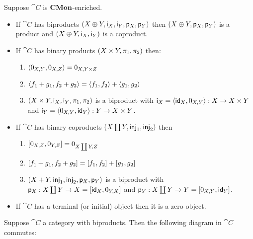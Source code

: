 \begin{proposition}
\label{prop:biproduct:from-product-or-coproduct}
Suppose $\cat{C}$ is $\mathbf{CMon}$-enriched.
\begin{itemize}
\item If $\cat{C}$ has biproducts $(X \oplus Y, \mathsf{i}_X, \mathsf{i}_Y, \mathsf{p}_X, \mathsf{p}_Y)$ then $(X
\oplus Y, \mathsf{p}_X, \mathsf{p}_Y)$ is a product and $(X \oplus Y, \mathsf{i}_X, \mathsf{i}_Y)$ is a coproduct.
\item If $\cat{C}$ has binary products $(X \times Y, \pi_1, \pi_2)$ then:
\begin{enumerate}
\item $\langle 0_{X,Y}, 0_{X,Z}\rangle = 0_{X,Y \times Z}$
\item $\langle f_1 + g_1, f_2 + g_2\rangle = \langle f_1, f_2\rangle + \langle g_1, g_2\rangle$
\item $(X \times Y, \mathsf{i}_X, \mathsf{i}_Y, \pi_1, \pi_2)$ is a biproduct with $\mathsf{i}_X =
\langle \mathsf{id}_X, 0_{X,Y}\rangle: X \to X \times Y$ and $\mathsf{i}_Y = \langle 0_{X,Y}, \mathsf{id}_Y\rangle: Y \to X \times Y$.
\end{enumerate}
\item If $\cat{C}$ has binary coproducts $(X \coprod Y, \mathsf{inj}_1, \mathsf{inj}_2)$ then
\begin{enumerate}
\item $[0_{X,Z}, 0_{Y,Z}] = 0_{X \coprod Y,Z}$
\item $[f_1 + g_1, f_2 + g_2] = [f_1, f_2] + [g_1, g_2]$
\item $(X + Y, \mathsf{inj}_1, \mathsf{inj}_2, \mathsf{p}_X, \mathsf{p}_Y)$ is a biproduct with $\mathsf{p}_X: X \coprod Y \to X =
[\mathsf{id}_X, 0_{Y,X}]$ and $\mathsf{p}_Y: X \coprod Y \to Y = [0_{X,Y}, \mathsf{id}_Y]$.
\end{enumerate}
\item If $\cat{C}$ has a terminal (or initial) object then it is a zero object.
\end{itemize}
\end{proposition}

\begin{proposition}
\label{prop:biproduct:prod-coprod}
Suppose $\cat{C}$ a category with biproducts. Then the following diagram in $\cat{C}$ commutes:

\begin{center}
\end{center}
\end{proposition}
